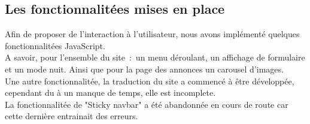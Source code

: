 \documentclass[11pt,a4paper]{article}
\begin{document}
\subsection{Les fonctionnalitées mises en place}
Afin de proposer de l'interaction à l'utilisateur, nous avons implémenté quelques fonctionnalitées JavaScript.\\
A savoir, pour l'ensemble du site~:~un menu déroulant, un affichage de formulaire et un mode nuit. Ainsi que pour la page des annonces un carousel d'images.\\
Une autre fonctionnalitée, la traduction du site a commencé à être développée, cependant du à un manque de temps, elle est incomplete.\\
La fonctionnalitée de "Sticky navbar" a été abandonnée en cours de route car cette dernière entrainait des erreurs.
\end{document}
